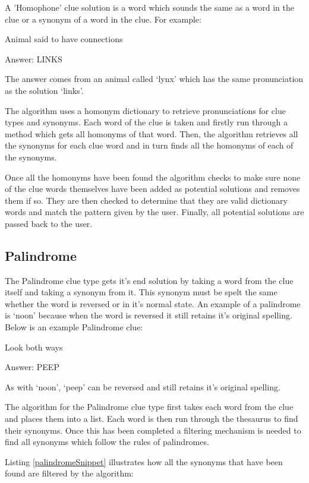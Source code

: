 A 'Homophone' clue solution is a word which sounds the same as a word 
in the clue or a synonym of a word in the clue. For example:

Animal said to have connections

Answer: LINKS

The answer comes from an animal called `lynx' which has the same 
pronunciation as the solution `links'. 

The algorithm uses a homonym dictionary to retrieve pronunciations 
for clue types and synonyms. Each word of the clue is taken and 
firstly run through a method which gets all homonyms of that word. 
Then, the algorithm retrieves all the synonyms for each clue word 
and in turn finds all the homonyms of each of the synonyms. 

Once all the homonyms have been found the algorithm checks to 
make sure none of the clue words themselves have been added as 
potential solutions and removes them if so. They are then checked to 
determine that they are valid dictionary words and match the 
pattern given by the user. Finally, all potential solutions are passed 
back to the user. 

\subsection{Palindrome}

The Palindrome clue type gets it's end solution by taking a word from 
the clue itself and taking a synonym from it. This synonym must be 
spelt the same whether the word is reversed or in it's normal state. 
An example of a palindrome is `noon' because when the word is reversed 
it still retains it's original spelling. Below is an example Palindrome clue:

Look both ways

Answer: PEEP

As with `noon', `peep' can be reversed and still retains it's original spelling. 

The algorithm for the Palindrome clue type first takes each word 
from the clue and places them into a list. Each word is then run through 
the thesaurus to find their synonyms. Once this has been completed a 
filtering mechanism is needed to find all synonyms which follow the 
rules of palindromes. 

Listing \ref{palindromeSnippet} illustrates how all the synonyms that have
 been found are filtered by the algorithm: 

